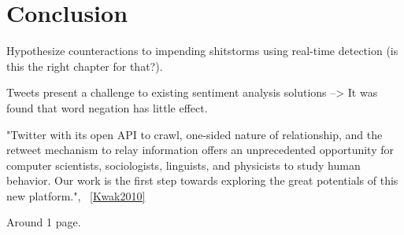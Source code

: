 \chapter{Conclusion}
\label{ch:conclusion}

Hypothesize counteractions to impending shitstorms using real-time detection (is this the right chapter for that?).

Tweets present a challenge to existing sentiment analysis solutions
--> It was found that word negation has little effect.

"Twitter with its open API to crawl, one-sided nature of relationship,
and the retweet mechanism to relay information offers an unprecedented
opportunity for computer scientists, sociologists, linguists,
and physicists to study human behavior. Our work is the first
step towards exploring the great potentials of this new platform.", ~\ref{Kwak2010}

Around 1 page.
\pagebreak[1]

